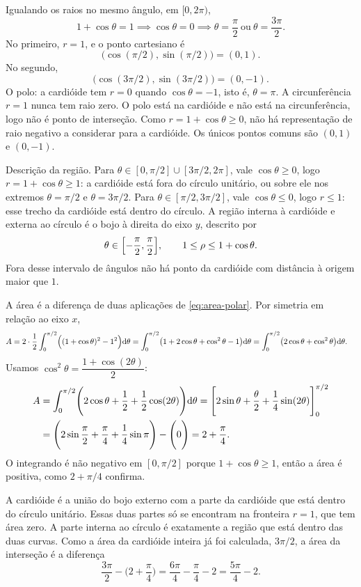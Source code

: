 \documentclass[11pt,a4paper]{article}
\begin{document}
\begin{exemplo}[Cardióide \(r=1+\cos\theta\) e circunferência \(r=1\)]
Igualando os raios no mesmo ângulo, em \([0,2\pi)\),
\[
1+\cos\theta=1\implies\cos\theta=0\implies\theta=\frac{\pi}{2}\ \text{ou}\ \theta=\frac{3\pi}{2}.
\]
No primeiro, \(r=1\), e o ponto cartesiano é
\[
\bigl(\cos(\pi/2),\sin(\pi/2)\bigr)=(0,1).
\]
No segundo,
\[
\bigl(\cos(3\pi/2),\sin(3\pi/2)\bigr)=(0,-1).
\]
O polo: a cardióide tem \(r=0\) quando \(\cos\theta=-1\), isto é, \(\theta=\pi\). A circunferência \(r=1\) nunca tem raio zero. O polo está na cardióide e não está na circunferência, logo não é ponto de interseção. Como \(r=1+\cos\theta\ge 0\), não há representação de raio negativo a considerar para a cardióide. Os únicos pontos comuns são \((0,1)\) e \((0,-1)\).

Descrição da região. Para \(\theta\in[0,\pi/2]\cup[3\pi/2,2\pi]\), vale \(\cos\theta\ge 0\), logo \(r=1+\cos\theta\ge 1\): a cardióide está fora do círculo unitário, ou sobre ele nos extremos \(\theta=\pi/2\) e \(\theta=3\pi/2\). Para \(\theta\in[\pi/2,3\pi/2]\), vale \(\cos\theta\le 0\), logo \(r\le 1\): esse trecho da cardióide está dentro do círculo. A região interna à cardióide e externa ao círculo é o bojo à direita do eixo \(y\), descrito por
\[
\theta\in\Bigl[-\frac{\pi}{2},\frac{\pi}{2}\Bigr],
\qquad
1\le\rho\le 1+\cos\theta.
\]
Fora desse intervalo de ângulos não há ponto da cardióide com distância à origem maior que \(1\).

A área é a diferença de duas aplicações de \eqref{eq:area-polar}. Por simetria em relação ao eixo \(x\),
\begin{align*}
A
&=2\cdot\frac12\int_{0}^{\pi/2}\Bigl((1+\cos\theta)^{2}-1^{2}\Bigr)\mathrm{d}\theta
=\int_{0}^{\pi/2}\bigl(1+2\cos\theta+\cos^{2}\theta-1\bigr)\mathrm{d}\theta
=\int_{0}^{\pi/2}\bigl(2\cos\theta+\cos^{2}\theta\bigr)\mathrm{d}\theta.
\end{align*}
Usamos \(\cos^{2}\theta=\dfrac{1+\cos(2\theta)}{2}\):
\begin{align*}
A
&=\int_{0}^{\pi/2}\Biggl(2\cos\theta+\frac12+\frac12\cos(2\theta)\Biggr)\mathrm{d}\theta
=\Biggl[2\sin\theta+\frac{\theta}{2}+\frac14\sin(2\theta)\Biggr]_{0}^{\pi/2}\\
&=\Biggl(2\sin\frac{\pi}{2}+\frac{\pi}{4}+\frac14\sin\pi\Biggr)-\Biggl(0\Biggr)
=2+\frac{\pi}{4}.
\end{align*}
O integrando é não negativo em \([0,\pi/2]\) porque \(1+\cos\theta\ge 1\), então a área é positiva, como \(2+\pi/4\) confirma.

A cardióide é a união do bojo externo com a parte da cardióide que está dentro do círculo unitário. Essas duas partes só se encontram na fronteira \(r=1\), que tem área zero. A parte interna ao círculo é exatamente a região que está dentro das duas curvas. Como a área da cardióide inteira já foi calculada, \(3\pi/2\), a área da interseção é a diferença
\[
\frac{3\pi}{2}-\Biggl(2+\frac{\pi}{4}\Biggr)
=\frac{6\pi}{4}-\frac{\pi}{4}-2
=\frac{5\pi}{4}-2.
\]
\end{exemplo}
\end{document}
